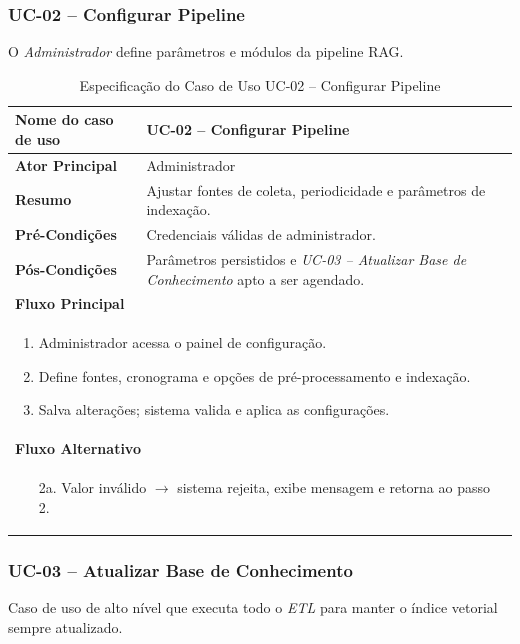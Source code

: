 \subsubsection{UC-02 – Configurar Pipeline}
\noindent
O \textit{Administrador} define parâmetros e módulos da pipeline RAG.

\begin{table}[H]
\centering
\caption{Especificação do Caso de Uso UC-02 – Configurar Pipeline}
\label{tab:uc02}
\begin{tabular}{|p{4cm}|p{11cm}|}
\hline
\textbf{Nome do caso de uso}     & UC-02 – Configurar Pipeline \\ \hline
\textbf{Ator Principal}          & Administrador \\ \hline
\textbf{Resumo}                  & Ajustar fontes de coleta, periodicidade e parâmetros de indexação. \\ \hline
\textbf{Pré-Condições}           & Credenciais válidas de administrador. \\ \hline
\textbf{Pós-Condições}           & Parâmetros persistidos e \emph{UC-03 – Atualizar Base de Conhecimento} apto a ser agendado. \\ \hline
\multicolumn{2}{|l|}{\textbf{Fluxo Principal}} \\ \hline
\multicolumn{2}{|p{15cm}|}{%
  \begin{enumerate}[leftmargin=*]
    \item Administrador acessa o painel de configuração.
    \item Define fontes, cronograma e opções de pré-processamento e indexação.
    \item Salva alterações; sistema valida e aplica as configurações.
  \end{enumerate}} \\ \hline
\multicolumn{2}{|l|}{\textbf{Fluxo Alternativo}} \\ \hline
\multicolumn{2}{|p{15cm}|}{%
  \begin{enumerate}[label=\arabic*a.,leftmargin=*]
    \item[2a.] Valor inválido $\to$ sistema rejeita, exibe mensagem e retorna ao passo 2.
  \end{enumerate}} \\ \hline
\end{tabular}
\end{table}

\subsubsection{UC-03 – Atualizar Base de Conhecimento}
\noindent
Caso de uso de alto nível que executa todo o \textit{ETL} para manter o
índice vetorial sempre atualizado.

